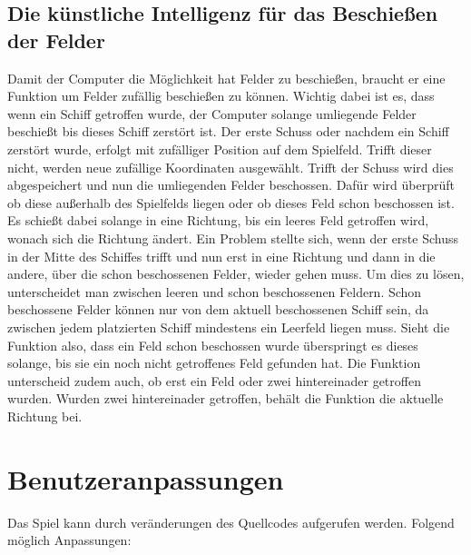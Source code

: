 \documentclass{llncs}
\begin{document}
\subsection{Die künstliche Intelligenz für das Beschießen der Felder}

Damit der Computer die Möglichkeit hat Felder zu beschießen, braucht er eine Funktion um Felder zufällig beschießen zu können. Wichtig dabei ist es, dass wenn ein Schiff getroffen wurde, der Computer solange umliegende Felder beschießt
bis dieses Schiff zerstört ist. Der erste Schuss oder nachdem ein Schiff zerstört wurde, erfolgt mit zufälliger Position auf dem Spielfeld. Trifft dieser nicht, werden neue zufällige Koordinaten ausgewählt. Trifft der Schuss
wird dies abgespeichert und nun die umliegenden Felder beschossen. Dafür wird überprüft ob diese außerhalb des Spielfelds liegen oder ob dieses Feld schon beschossen ist. Es schießt dabei solange in eine Richtung, bis
ein leeres Feld getroffen wird, wonach sich die Richtung ändert. Ein Problem stellte sich, wenn der erste Schuss in der Mitte des Schiffes trifft und nun erst in eine Richtung und dann in die andere, über die schon beschossenen Felder,
wieder gehen muss. Um dies zu lösen, unterscheidet man zwischen leeren und schon beschossenen Feldern. Schon beschossene Felder können nur von dem aktuell beschossenen Schiff sein, da zwischen jedem platzierten Schiff mindestens
ein Leerfeld liegen muss. Sieht die Funktion also, dass ein Feld schon beschossen wurde überspringt es dieses solange, bis sie ein noch nicht getroffenes Feld gefunden hat. Die Funktion unterscheid zudem auch, ob erst ein Feld oder zwei hintereinader 
getroffen wurden. Wurden zwei hintereinader getroffen, behält die Funktion die aktuelle Richtung bei.

\section{Benutzeranpassungen}

Das Spiel kann durch veränderungen des Quellcodes aufgerufen werden. Folgend möglich Anpassungen:
\end{document}
